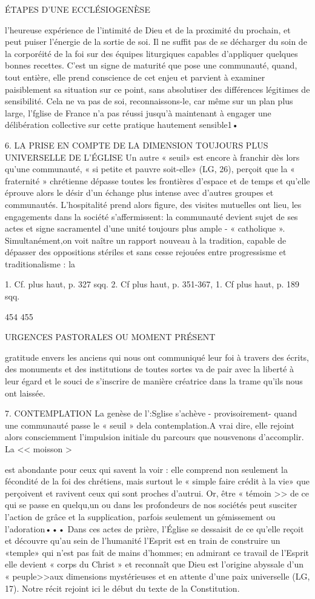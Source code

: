 {{ÉTAPES D'UNE ECCLÉSIOGENÈSE

l'heureuse expérience de l'intimité de Dieu et de la proximité du prochain, et peut puiser l'énergie de la sortie de soi.
Il ne suffit pas de se décharger du soin de la corporéité de la foi sur des équipes liturgiques capables d'appliquer quelques bonnes recettes. C'est un signe de maturité que pose une communauté, quand, tout entière, elle prend conscience de cet enjeu et parvient à examiner paisiblement sa situation sur ce point, sans absolutiser des différences légitimes de sensibilité. Cela ne va pas de soi, reconnaissons-le, car même sur un plan plus large, l'fglise de France n'a pas réussi jusqu'à maintenant à engager une délibération collective sur cette pratique hautement sensible1•

6.	LA PRISE EN COMPTE DE LA DIMENSION TOUJOURS PLUS UNIVERSELLE DE L'ÉGLISE
Un autre « seuil» est encore à franchir dès lors qu'une communauté, « si petite et pauvre soit-elle» (LG, 26), perçoit que la « fraternité » chrétienne dépasse toutes les frontières d'espace et de temps et qu'elle éprouve alors le désir d'un échange plus intense avec d'autres groupes et communautés. L'hospitalité prend alors figure, des visites mutuelles ont lieu, les engagements dans la société s'affermissent: la communauté devient sujet de ses actes et signe sacramentel d'une unité toujours plus ample
-		« catholique ». Simultanément,on voit naître un rapport nouveau à la tradition, capable de dépasser des oppositions stériles et sans cesse rejouées entre progressisme et traditionalisme : la
 

1.	Cf. plus haut, p. 327 sqq.
2.	Cf plus haut, p. 351-367,	1. Cf plus haut, p. 189 sqq.

454	455
 
URGENCES PASTORALES OU MOMENT PRÉSENT

gratitude envers les anciens qui nous ont communiqué leur foi à travers des écrits, des monuments et des institutions de toutes sortes va de pair avec la liberté à leur égard et le souci de s'inscrire de manière créatrice dans la trame qu'ils nous ont laissée.

7.	CONTEMPLATION
La genèse de l':Sglise s'achève -	provisoirement-	quand une communauté passe le « seuil » dela contemplation.A vrai dire, elle rejoint alors consciemment l'impulsion initiale du parcours que nousvenons d'accomplir. La << moisson >} est abondante pour ceux qui savent la voir : elle comprend non seulement la fécondité de
la foi des chrétiens, mais surtout le « simple faire crédit à la vie» que perçoivent et ravivent ceux qui sont proches d'autrui. Or, être
« témoin >> de ce qui se passe en quelqu,un ou dans les profondeurs de nos sociétés peut susciter l'action de grâce et la supplication, parfois seulement un gémissement ou l'adoration••• Dans ces actes de prière, l'Église se dessaisit de ce qu'elle reçoit et découvre qu'au sein de l'humanité l'Esprit est en train de construire un
«temple» qui n'est pas fait de mains d'hommes; en admirant ce travail de l'Esprit elle devient « corps du Christ » et reconnaît que Dieu est l'origine abyssale d'un « peuple>>aux dimensions mystérieuses et en attente d'une paix universelle (LG, 17). Notre récit rejoint ici le début du texte de la Constitution.

}
